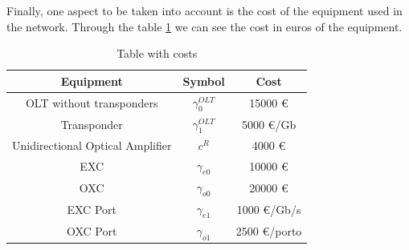 Finally, one aspect to be taken into account is the cost of the equipment used in the network. Through the table \ref{table_cost_ilp} we can see the cost in euros of the equipment.\\

\begin{table}[h!]
\centering
\begin{tabular}{|| c | c | c||}
 \hline
 Equipment & Symbol & Cost \\
 \hline\hline
 OLT without transponders & $\gamma_0^{OLT}$ & 15000 \euro \\
 Transponder & $\gamma_1^{OLT}$ & 5000 \euro/Gb \\
 Unidirectional Optical Amplifier & $c^R$ & 4000 \euro \\
 EXC & $\gamma_{e0}$ & 10000 \euro \\
 OXC & $\gamma_{o0}$ & 20000 \euro \\
 EXC Port & $\gamma_{e1}$ & 1000 \euro /Gb/s\\
 OXC Port & $\gamma_{o1}$ & 2500 \euro /porto \\
 \hline
\end{tabular}
\caption{Table with costs}
\label{table_cost_ilp}
\end{table}



